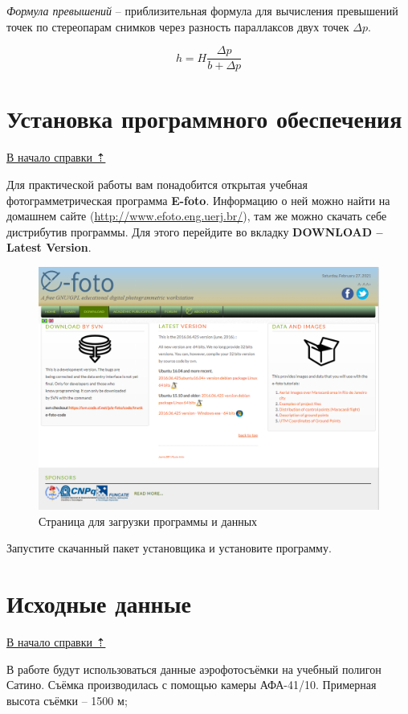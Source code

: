 \documentclass[
  12pt,
]{book}
\begin{document}
\emph{Формула превышений} -- приблизительная формула для вычисления превышений точек по стереопарам снимков через разность параллаксов двух точек \(\Delta p\).

\[h = H\frac{\Delta p }{b + \Delta p}\]

\section{Установка программного обеспечения}\label{stereo-soft}

\hyperref[stereo]{В начало справки ⇡}

Для практической работы вам понадобится открытая учебная фотограмметрическая программа \textbf{E-foto}. Информацию о ней можно найти на домашнем сайте (\url{http://www.efoto.eng.uerj.br/}), там же можно скачать себе дистрибутив программы. Для этого перейдите во вкладку \textbf{DOWNLOAD -- Latest Version}.

\begin{figure}
\centering
\includegraphics{images/Stereo/Download.png}
\caption{Страница для загрузки программы и данных}
\end{figure}

Запустите скачанный пакет установщика и установите программу.

\section{Исходные данные}\label{stereo-initial}

\hyperref[stereo]{В начало справки ⇡}

В работе будут использоваться данные аэрофотосъёмки на учебный полигон Сатино. Съёмка производилась с помощью камеры АФА-41/10.
Примерная высота съёмки -- 1500 м;
\end{document}
